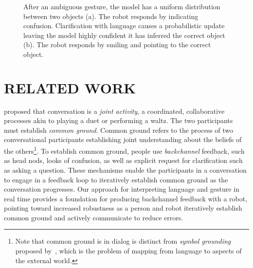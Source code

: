 \documentclass[letterpaper, 10 pt, conference]{ieeeconf}
\begin{document}
\begin{figure}
\centering
{}
\caption{After an ambiguous gesture, the model has a uniform
  distribution between two objects (a).  The robot responds by
  indicating confusion.  Clarification with language causes a
  probabilistic update leaving the model highly confident it has
  inferred the correct object (b).  The robot responds by smiling and
  pointing to the correct object. \label{fig:cartoon}}
\end{figure}

\section{RELATED WORK}

\citet{clark96} proposed that conversation is a {\em joint activity},
a coordinated, collaborative processes akin to playing a duet or
performing a waltz.  The two participants must establish {\em common
  ground}.  Common ground refers to the process of two conversational
participants establishing joint understanding about the beliefs of the
others\footnote{Note that common ground is in dialog is distinct from
  {\em symbol grounding} proposed by~\citet{harnad90}, which is the
  problem of mapping from language to aspects of the external world.}.
To establish common ground, people use {\em backchannel} feedback,
such as head nods, looks of confusion, as well as explicit request for
clarification such as asking a question.  These mechanisms enable the
participants in a conversation to engage in a feedback loop to
iteratively establish common ground as the conversation progresses.
Our approach for interpreting language and gesture in real time
provides a foundation for producing backchannel feedback with a robot,
pointing toward increased robustness as a person and robot iteratively
establish common ground and actively communicate to reduce errors.
\end{document}

